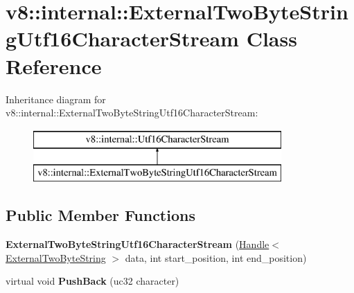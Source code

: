 \hypertarget{classv8_1_1internal_1_1_external_two_byte_string_utf16_character_stream}{}\section{v8\+:\+:internal\+:\+:External\+Two\+Byte\+String\+Utf16\+Character\+Stream Class Reference}
\label{classv8_1_1internal_1_1_external_two_byte_string_utf16_character_stream}
Inheritance diagram for v8\+:\+:internal\+:\+:External\+Two\+Byte\+String\+Utf16\+Character\+Stream\+:\begin{figure}[H]
\begin{center}
\leavevmode
\includegraphics[height=2.000000cm]{classv8_1_1internal_1_1_external_two_byte_string_utf16_character_stream}
\end{center}
\end{figure}
\subsection*{Public Member Functions}
\begin{DoxyCompactItemize}
\item 
\hypertarget{classv8_1_1internal_1_1_external_two_byte_string_utf16_character_stream_a610de706475becc6bacd2f40bf2a08c9}{}{\bfseries External\+Two\+Byte\+String\+Utf16\+Character\+Stream} (\hyperlink{classv8_1_1internal_1_1_handle}{Handle}$<$ \hyperlink{classv8_1_1internal_1_1_external_two_byte_string}{External\+Two\+Byte\+String} $>$ data, int start\+\_\+position, int end\+\_\+position)\label{classv8_1_1internal_1_1_external_two_byte_string_utf16_character_stream_a610de706475becc6bacd2f40bf2a08c9}

\item 
\hypertarget{classv8_1_1internal_1_1_external_two_byte_string_utf16_character_stream_a6b9e314ed7c0fb50d28ab95d1aaa08cb}{}virtual void {\bfseries Push\+Back} (uc32 character)\label{classv8_1_1internal_1_1_external_two_byte_string_utf16_character_stream_a6b9e314ed7c0fb50d28ab95d1aaa08cb}

\end{DoxyCompactItemize}
